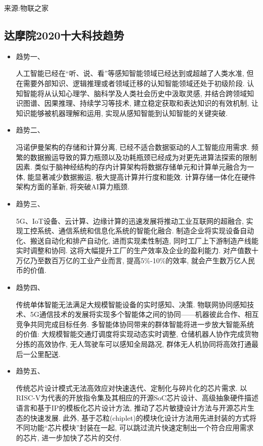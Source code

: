 来源:物联之家
\subsection{达摩院2020十大科技趋势}
\begin{itemize}
\item  趋势一、

人工智能已经在“听、说、看”等感知智能领域已经达到或超越了人类水准, 但在需要外部知识、逻辑推理或者领域迁移的认知智能领域还处于初级阶段. 认知智能将从认知心理学、脑科学及人类社会历史中汲取灵感, 并结合跨领域知识图谱、因果推理、持续学习等技术, 建立稳定获取和表达知识的有效机制, 让知识能够被机器理解和运用, 实现从感知智能到认知智能的关键突破.

\item  趋势二、

冯诺伊曼架构的存储和计算分离, 已经不适合数据驱动的人工智能应用需求. 频繁的数据搬运导致的算力瓶颈以及功耗瓶颈已经成为对更先进算法探索的限制因素. 类似于脑神经结构的存内计算架构将数据存储单元和计算单元融合为一体, 能显著减少数据搬运, 极大提高计算并行度和能效. 计算存储一体化在硬件架构方面的革新, 将突破AI算力瓶颈.

\item  趋势三、

5G、IoT设备、云计算、边缘计算的迅速发展将推动工业互联网的超融合, 实现工控系统、通信系统和信息化系统的智能化融合. 制造企业将实现设备自动化、搬送自动化和排产自动化, 进而实现柔性制造, 同时工厂上下游制造产线能实时调整和协同. 这将大幅提升工厂的生产效率及企业的盈利能力. 对产值数十万亿乃至数百万亿的工业产业而言, 提高5\%-10\%的效率, 就会产生数万亿人民币的价值.

\item  趋势四、

传统单体智能无法满足大规模智能设备的实时感知、决策. 物联网协同感知技术、5G通信技术的发展将实现多个智能体之间的协同——机器彼此合作、相互竞争共同完成目标任务. 多智能体协同带来的群体智能将进一步放大智能系统的价值: 大规模智能交通灯调度将实现动态实时调整, 仓储机器人协作完成货物分拣的高效协作, 无人驾驶车可以感知全局路况, 群体无人机协同将高效打通最后一公里配送.

\item  趋势五、

传统芯片设计模式无法高效应对快速迭代、定制化与碎片化的芯片需求. 以RISC-V为代表的开放指令集及其相应的开源SoC芯片设计、高级抽象硬件描述语言和基于IP的模板化芯片设计方法, 推动了芯片敏捷设计方法与开源芯片生态的快速发展. 此外, 基于芯粒(chiplet)的模块化设计方法用先进封装的方式将不同功能“芯片模块”封装在一起, 可以跳过流片快速定制出一个符合应用需求的芯片, 进一步加快了芯片的交付.


\end{itemize}
